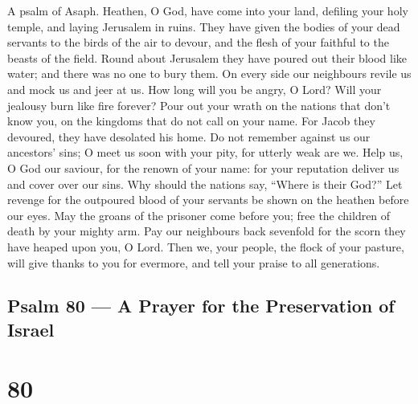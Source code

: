 A psalm of Asaph.  Heathen, O God, have come into your land,
defiling your holy temple, and laying Jerusalem in ruins. 
They have given the bodies of your dead servants to the birds of the air
to devour, and the flesh of your faithful to the beasts of the field.
 Round about Jerusalem they have poured out their blood like
water; and there was no one to bury them.  On every side our
neighbours revile us and mock us and jeer at us.  How long
will you be angry, O Lord? Will your jealousy burn like fire forever?
 Pour out your wrath on the nations that don't know you, on
the kingdoms that do not call on your name.  For Jacob they
devoured, they have desolated his home.  Do not remember
against us our ancestors' sins; O meet us soon with your pity, for
utterly weak are we.  Help us, O God our saviour, for the
renown of your name: for your reputation deliver us and cover over our
sins.  Why should the nations say, ``Where is their God?''
Let revenge for the outpoured blood of your servants be shown on the
heathen before our eyes.  May the groans of the prisoner
come before you; free the children of death by your mighty arm.
 Pay our neighbours back sevenfold for the scorn they have
heaped upon you, O Lord.  Then we, your people, the flock
of your pasture, will give thanks to you for evermore, and tell your
praise to all generations.

\hypertarget{psalm-80-a-prayer-for-the-preservation-of-israel}{%
\subsection{Psalm 80 --- A Prayer for the Preservation of
Israel}\label{psalm-80-a-prayer-for-the-preservation-of-israel}}

\hypertarget{section-79}{%
\section{80}\label{section-79}}

